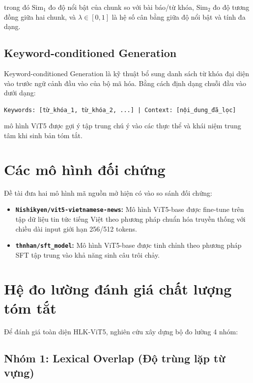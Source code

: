 \noindent trong đó $\text{Sim}_1$ đo độ nổi bật của chunk so với bài báo/từ khóa, $\text{Sim}_2$ đo độ tương đồng giữa hai chunk, và $\lambda \in [0,1]$ là hệ số cân bằng giữa độ nổi bật và tính đa dạng.

\subsection{Keyword-conditioned Generation}

Keyword-conditioned Generation là kỹ thuật bổ sung danh sách từ khóa đại diện vào trước ngữ cảnh đầu vào của bộ mã hóa. Bằng cách định dạng chuỗi đầu vào dưới dạng:

\begin{center}
\texttt{Keywords: [từ\_khóa\_1, từ\_khóa\_2, ...] | Context: [nội\_dung\_đã\_lọc]}
\end{center}

\noindent mô hình ViT5 được gợi ý tập trung chú ý vào các thực thể và khái niệm trung tâm khi sinh bản tóm tắt.

\section{Các mô hình đối chứng}

Đề tài đưa hai mô hình mã nguồn mở hiện có vào so sánh đối chứng:

\begin{itemize}
  \item \textbf{\texttt{Nishikyen/vit5-vietnamese-news}:} Mô hình ViT5-base được fine-tune trên tập dữ liệu tin tức tiếng Việt theo phương pháp chuẩn hóa truyền thống với chiều dài input giới hạn 256/512 tokens.
  \item \textbf{\texttt{thnhan/sft\_model}:} Mô hình ViT5-base được tinh chỉnh theo phương pháp SFT tập trung vào khả năng sinh câu trôi chảy.
\end{itemize}

\section{Hệ đo lường đánh giá chất lượng tóm tắt}

Để đánh giá toàn diện HLK-ViT5, nghiên cứu xây dựng bộ đo lường 4 nhóm:

\subsection{Nhóm 1: Lexical Overlap (Độ trùng lặp từ vựng)}

